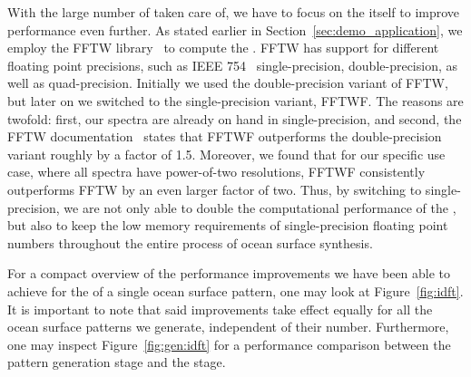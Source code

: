With the large number of \InvDiscreteFourierTransforms taken care of, we have to
focus on the \IDFT itself to improve performance even further.
As stated earlier in Section~\ref{sec:demo_application}, we employ the FFTW
library~\cite{FFTW05} to compute the \InvDiscreteFourierTransform.
FFTW has support for different floating point
precisions, such as IEEE 754~\citep{IEEE:754} single-precision,
double-precision, as well as quad-precision. Initially we used the
double-precision variant of FFTW, but later on we switched to the
single-precision variant, FFTWF. The reasons are twofold: first, our spectra
are already on hand in single-precision, and second, the
FFTW documentation~\citep{misc:fftw:speed} states that FFTWF outperforms
the double-precision variant roughly by a factor of 1.5.
Moreover, we found that for our specific use case, where all spectra have
power-of-two resolutions, FFTWF consistently outperforms FFTW by an even larger
factor of two. Thus, by switching to single-precision, we are not only able to
double the computational performance of the \IDFT, but also to keep the low
memory requirements of single-precision floating point numbers throughout the
entire process of ocean surface synthesis.

For a compact overview of the performance improvements we have been able to
achieve for the \IDFTs of a single ocean surface pattern, one may look at
Figure~\ref{fig:idft}. It is important to note that said improvements take
effect equally for all the ocean surface patterns we generate, independent of
their number.
Furthermore, one may inspect Figure~\ref{fig:gen:idft}
for a performance comparison between the pattern generation stage and the
\InvDiscreteFourierTransform stage.


